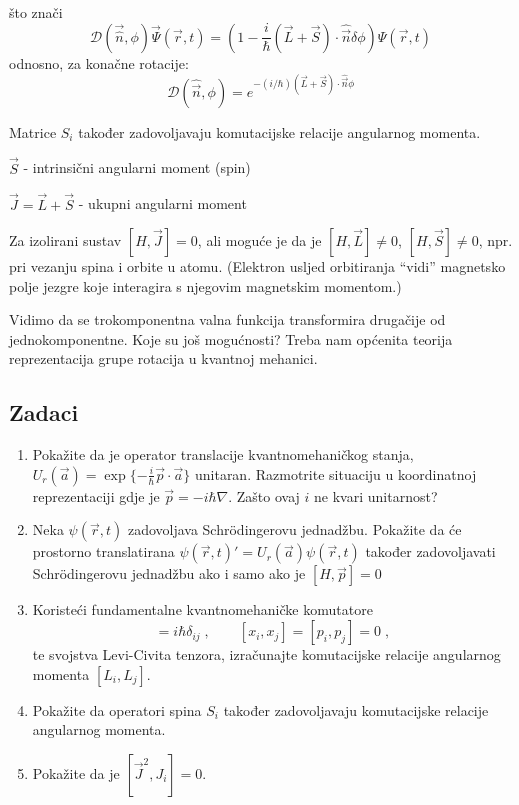 što znači
\begin{equation*}
\mathcal{D}(\vec{\hat{n}},\phi)\vec{\Psi}(\vec{r}, t)=
 \left(1-\frac{i}{\hbar}(\vec{L}+\vec{S})\cdot\hat{\vec{n}}\delta\phi \right)
  \Psi(\vec{r}, t)
\end{equation*}
odnosno, za konačne rotacije:
\begin{equation}
\mathcal{D}(\hat{\vec{n}}, \phi)=
 e^{-(i/\hbar)(\vec{L}+\vec{S})\cdot\hat{\vec{n}}\phi}
\end{equation}

Matrice $S_i$ također zadovoljavaju komutacijske relacije angularnog
momenta.


$\vec{S}$ - intrinsični angularni moment (spin)

$\vec{J}=\vec{L}+\vec{S}$  - ukupni angularni moment

Za izolirani sustav $[H, \vec{J}] = 0$, ali moguće je da je
$[H, \vec{L}] \neq 0$, $[H, \vec{S}] \neq 0$, npr. pri vezanju spina
i orbite u atomu. (Elektron usljed orbitiranja ``vidi'' magnetsko polje
jezgre koje interagira s njegovim magnetskim momentom.)

Vidimo da se trokomponentna valna funkcija transformira drugačije
od jednokomponentne. Koje su još mogućnosti? Treba nam općenita teorija
reprezentacija grupe rotacija u kvantnoj mehanici.

\subsection*{Zadaci}

\begin{enumerate}[label=\arabic{chapter}.\arabic*.]

\item Pokažite da je operator translacije kvantnomehaničkog stanja,
 $U_{r}(\vec{a}) = \exp \{-\frac{i}{\hbar} \vec{p}\cdot \vec{a} \}$
unitaran. Razmotrite situaciju u koordinatnoj reprezentaciji gdje
je $\vec{p} = -i \hbar \nabla$. Zašto ovaj $i$ ne kvari unitarnost?

\item Neka $\psi(\vec{r}, t)$ zadovoljava Schr\"{o}dingerovu jednadžbu.
Pokažite da će prostorno translatirana $\psi(\vec{r}, t)' = 
U_{r}(\vec{a}) \psi(\vec{r}, t)$ također zadovoljavati Schr\"{o}dingerovu
jednadžbu ako i samo ako je $[H, \vec{p}] = 0$

\item Koristeći fundamentalne kvantnomehaničke komutatore
\begin{displaymath}
 [x_i, p_j] = i\hbar \delta_{ij}\;, \qquad
 [x_i, x_j] = [p_i, p_j] = 0 \;,
\end{displaymath}
te svojstva Levi-Civita tenzora, izračunajte komutacijske
relacije angularnog momenta $[L_i, L_j]$.

\item Pokažite da operatori spina $S_i$ također zadovoljavaju komutacijske
relacije angularnog momenta.

\item Pokažite da je $[\vec{J}^2, J_i] = 0$.
\end{enumerate}

